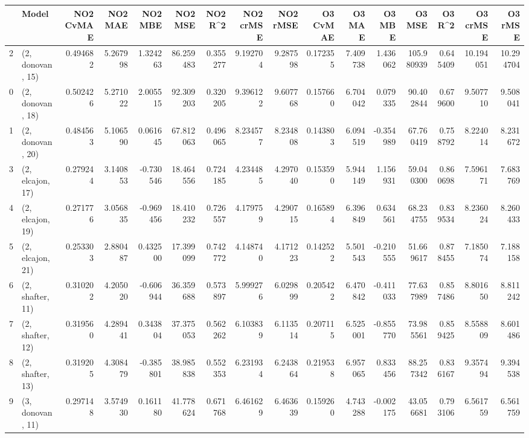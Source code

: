 \begin{tabular}{llrrrrrrrrrrrrrr}
\toprule
{} &             Model &  NO2 CvMAE &   NO2 MAE &   NO2 MBE &    NO2 MSE &   NO2 R\textasciicircum2 &  NO2 crMSE &  NO2 rMSE &  O3 CvMAE &     O3 MAE &    O3 MBE &      O3 MSE &    O3 R\textasciicircum2 &   O3 crMSE &    O3 rMSE \\
\midrule
2  &  (2, donovan, 15) &   0.494682 &  5.267998 &  1.324263 &  86.259483 &  0.355277 &   9.192704 &  9.287598 &  0.172355 &   7.409738 &  1.436062 &  105.980939 &  0.645409 &  10.194051 &  10.294704 \\
0  &  (2, donovan, 18) &   0.502426 &  5.271022 &  2.005515 &  92.309203 &  0.320205 &   9.396122 &  9.607768 &  0.157660 &   6.704042 &  0.079335 &   90.402844 &  0.679600 &   9.507710 &   9.508041 \\
1  &  (2, donovan, 20) &   0.484563 &  5.106590 &  0.061645 &  67.812063 &  0.496065 &   8.234577 &  8.234808 &  0.143803 &   6.094519 & -0.354989 &   67.760419 &  0.758792 &   8.224014 &   8.231672 \\
3  &  (2, elcajon, 17) &   0.279244 &  3.140853 & -0.730546 &  18.464556 &  0.724185 &   4.234485 &  4.297040 &  0.153590 &   5.944149 &  1.156931 &   59.040300 &  0.860698 &   7.596171 &   7.683769 \\
4  &  (2, elcajon, 19) &   0.271776 &  3.056835 & -0.969456 &  18.410232 &  0.726557 &   4.179759 &  4.290715 &  0.165894 &   6.396849 &  0.634561 &   68.234755 &  0.839534 &   8.236024 &   8.260433 \\
5  &  (2, elcajon, 21) &   0.253303 &  2.880487 &  0.432500 &  17.399099 &  0.742772 &   4.148740 &  4.171223 &  0.142522 &   5.501543 & -0.210555 &   51.669617 &  0.878455 &   7.185074 &   7.188158 \\
6  &  (2, shafter, 11) &   0.310202 &  4.205020 & -0.606944 &  36.359688 &  0.573897 &   5.999276 &  6.029899 &  0.205422 &   6.470842 & -0.411033 &   77.637989 &  0.857486 &   8.801650 &   8.811242 \\
7  &  (2, shafter, 12) &   0.319560 &  4.289441 &  0.343804 &  37.375053 &  0.562262 &   6.103839 &  6.113514 &  0.207115 &   6.525001 & -0.855770 &   73.985561 &  0.859425 &   8.558809 &   8.601486 \\
8  &  (2, shafter, 13) &   0.319205 &  4.308479 & -0.385801 &  38.985838 &  0.552353 &   6.231934 &  6.243864 &  0.219538 &   6.957065 &  0.833456 &   88.257342 &  0.836167 &   9.357494 &   9.394538 \\
9  &  (3, donovan, 11) &   0.297148 &  3.574930 &  0.161180 &  41.778624 &  0.671768 &   6.461629 &  6.463639 &  0.159260 &   4.743288 & -0.002175 &   43.056681 &  0.793106 &   6.561759 &   6.561759 \\

\end{tabular}
